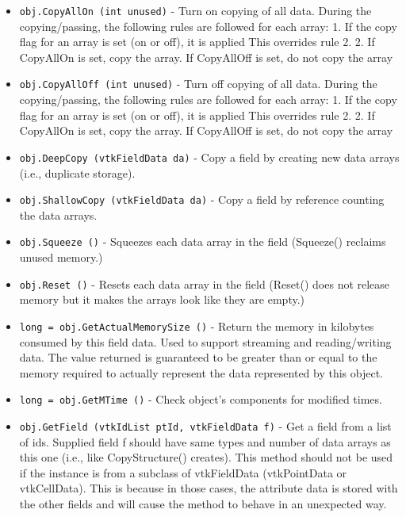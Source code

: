 \begin{itemize}
\item  \verb|obj.CopyAllOn (int unused)| -  Turn on copying of all data.
 During the copying/passing, the following rules are followed for each
 array:
 1. If the copy flag for an array is set (on or off), it is applied
    This overrides rule 2.
 2. If CopyAllOn is set, copy the array.
    If CopyAllOff is set, do not copy the array

\item  \verb|obj.CopyAllOff (int unused)| -  Turn off copying of all data.
 During the copying/passing, the following rules are followed for each
 array:
 1. If the copy flag for an array is set (on or off), it is applied
    This overrides rule 2.
 2. If CopyAllOn is set, copy the array.
    If CopyAllOff is set, do not copy the array

\item  \verb|obj.DeepCopy (vtkFieldData da)| -  Copy a field by creating new data arrays (i.e., duplicate storage).

\item  \verb|obj.ShallowCopy (vtkFieldData da)| -  Copy a field by reference counting the data arrays.

\item  \verb|obj.Squeeze ()| -  Squeezes each data array in the field (Squeeze() reclaims unused memory.)

\item  \verb|obj.Reset ()| -  Resets each data array in the field (Reset() does not release memory but
 it makes the arrays look like they are empty.)

\item  \verb|long = obj.GetActualMemorySize ()| -  Return the memory in kilobytes consumed by this field data. Used to
 support streaming and reading/writing data. The value returned is
 guaranteed to be greater than or equal to the memory required to
 actually represent the data represented by this object.

\item  \verb|long = obj.GetMTime ()| -  Check object's components for modified times.

\item  \verb|obj.GetField (vtkIdList ptId, vtkFieldData f)| -  Get a field from a list of ids. Supplied field f should have same
 types and number of data arrays as this one (i.e., like
 CopyStructure() creates).  This method should not be used if the
 instance is from a subclass of vtkFieldData (vtkPointData or
 vtkCellData).  This is because in those cases, the attribute data
 is stored with the other fields and will cause the method to
 behave in an unexpected way.


\end{itemize}
